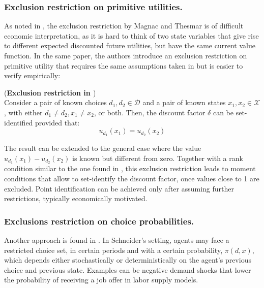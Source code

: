 \subsubsection{Exclusion restriction on primitive utilities.}

As noted in \textcite{AbbringDaljord2020-1}, the exclusion restriction by Magnac and Thesmar is of difficult economic interpretation, as it is hard to think of two state variables that give rise to different expected discounted future utilities, but have the same current value function. In the same paper, the authors introduce an exclusion restriction on primitive utility that requires the same assumptions taken in \textcite{MagnacThesmar2002} but is easier to verify empirically:

\medskip

\begin{proposition} (\textbf{Exclusion restriction in \cite{AbbringDaljord2020-1}}) \label{def:res-abbring} \\
Consider a pair of known choices $d_1, d_2 \in \mathcal{D}$ and a pair of known states $x_1, x_2 \in \mathcal{X}$, with either $d_1 \neq d_2, x_1 \neq x_2$, or both. Then, the discount factor $\delta$ can be set-identified provided that:
\begin{equation*}
u_{d_1}(x_1) = u_{d_2}(x_2)
\end{equation*}
\end{proposition}

\medskip

The result can be extended to the general case where the value $u_{d_1}(x_1) - u_{d_2}(x_2)$ is known but different from zero. Together with a rank condition similar to the one found in \textcite{MagnacThesmar2002}, this exclusion restriction leads to moment conditions that allow to set-identify the discount factor, once values close to 1 are excluded. Point identification can be achieved only after assuming further restrictions, typically economically motivated.

\subsubsection{Exclusions restriction on choice probabilities.}

Another approach is found in \textcite{Schneider2020}. In Schneider's setting, agents may face a restricted choice set, in certain periods and with a certain probability, $\pi(d, x)$, which depends either stochastically or deterministically on the agent's previous choice and previous state. Examples can be negative demand shocks that lower the probability of receiving a job offer in labor supply models.

